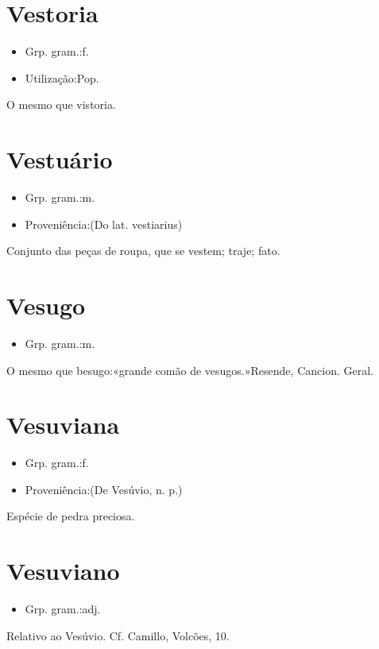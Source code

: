 \documentclass{article}
\begin{document}
\section{Vestoria}
\begin{itemize}
\item {Grp. gram.:f.}
\end{itemize}
\begin{itemize}
\item {Utilização:Pop.}
\end{itemize}
O mesmo que \textunderscore vistoria\textunderscore .
\section{Vestuário}
\begin{itemize}
\item {Grp. gram.:m.}
\end{itemize}
\begin{itemize}
\item {Proveniência:(Do lat. \textunderscore vestiarius\textunderscore )}
\end{itemize}
Conjunto das peças de roupa, que se vestem; traje; fato.
\section{Vesugo}
\begin{itemize}
\item {Grp. gram.:m.}
\end{itemize}
O mesmo que \textunderscore besugo\textunderscore :«\textunderscore grande comão de vesugos.\textunderscore »Resende, \textunderscore Cancion. Geral.\textunderscore 
\section{Vesuviana}
\begin{itemize}
\item {Grp. gram.:f.}
\end{itemize}
\begin{itemize}
\item {Proveniência:(De \textunderscore Vesúvio\textunderscore , n. p.)}
\end{itemize}
Espécie de pedra preciosa.
\section{Vesuviano}
\begin{itemize}
\item {Grp. gram.:adj.}
\end{itemize}
Relativo ao Vesúvio. Cf. Camillo, \textunderscore Volcões\textunderscore , 10.
\end{document}
